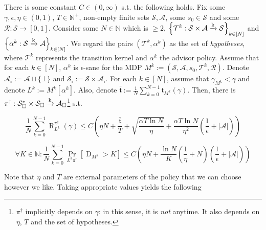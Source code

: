 \documentclass[anon,12pt]{colt2018} %
\newcommand{\AP}[1]{\left(#1\right)}
\newcommand{\AB}[1]{\left[#1\right]}
\newcommand{\AC}[1]{\left\{#1\right\}}
\newcommand{\Pa}[2]{\underset{#1}{\operatorname{Pr}}\AB{#2}}
\newcommand{\Nats}{\mathbb{N}}
\newcommand{\Abs}[1]{\left\vert #1 \right\vert}
\newcommand{\K}{\xrightarrow{\textnormal{k}}}
\newcommand{\A}{\mathcal{A}}
\newcommand{\St}{\mathcal{S}}
\newcommand{\T}{\mathcal{T}}
\newcommand{\R}{\mathcal{R}}
\newcommand{\Rg}{\operatorname{R}}
\newcommand{\MP}[2]{#1#2}
\newcommand{\MA}[2]{#1\AB{#2}}
\newcommand{\Tn}{\mathfrak{t}}
\newcommand{\Ad}{\alpha}
\newcommand{\ND}{\operatorname{D}}
\begin{document}
\begin{samepage}
\begin{theorem}
\label{thm:regret_bound}

There is some constant $C \in (0,\infty)$ s.t. the following holds. Fix some $\gamma,\epsilon,\eta \in (0,1)$, $T\in\Nats^+$, non-empty finite sets $\St,\A$, some $s_0 \in \St$ and some $\R: \St \rightarrow [0,1]$. Consider some $N \in \Nats$ which is $\geq 2$, $\AC{\T^k: \St \times \A \K \St}_{k\in[N]}$ and $\AC{\Ad^k :\St \K \A}_{k\in[N]}$. We regard the pairs $(\T^k,\Ad^k)$ as the set of \emph{hypotheses}, where $\T^k$ represents the transition kernel and $\Ad^k$ the advisor policy. Assume that for each $k\in[N]$, $\Ad^k$ is $\epsilon$-sane for the MDP $M^k:=\AP{\St,\A,s_0,\T^k,\R}$. Denote $\A_\square:=\A\sqcup\{\bot\}$ and $\St_\square:=\St \times \A_\square$. For each $k \in [N]$, assume that $\gamma_{M^k} < \gamma$ and denote $L^k:=\MA{M^k}{\Ad^k}$. Also, denote $\bar{\Tn}:=\frac{1}{N}\sum_{k=0}^{N-1} \Tn_{M^k}(\gamma)$. Then, there is $\pi^\dagger: \St_\square^* \times \St_\square \K \A_\square$\footnote{$\pi^\dagger$ implicitly depends on $\gamma$: in this sense, it is \emph{not} anytime. It also depends on $\eta$, $T$ and the set of hypotheses.} s.t.

\begin{equation}
\label{eqn:thm__regret_bound__regret}
\frac{1}{N}\sum_{k=0}^{N-1}\Rg_{L^k}^{\pi^\dagger}(\gamma) \leq C\AP{\eta N+\frac{\bar{\Tn}}{T}+\sqrt{\frac{\alpha T \ln{N}}{\eta}}+\frac{\alpha T \ln{N}}{\eta^2}\AP{\frac{1}{\epsilon}+\Abs{\A}}}
\end{equation}

\begin{equation}
\label{eqn:thm__regret_bound__delegations}
\forall K \in \Nats: \frac{1}{N}\sum_{k=0}^{N-1}\Pa{\MP{L^k}{\pi^\dagger}}{\ND_{M^k} > K} \leq C\AP{\eta N +\frac{\ln{N}}{K}\AP{\frac{1}{\eta}+N}\AP{\frac{1}{\epsilon}+\Abs{\A}}}
\end{equation}

\end{theorem}
\end{samepage}

Note that $\eta$ and $T$ are external parameters of the policy that we can choose however we like. Taking appropriate values yields the following
\end{document}
